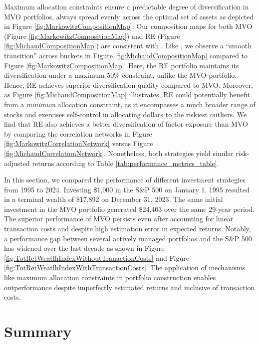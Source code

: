 \documentclass[12pt,letterpaper]{article}
\begin{document}
Maximum allocation constraints ensure a predictable degree of diversification in MVO portfolios, always spread evenly across the optimal set of assets as depicted in Figure \ref{fig:MarkowitzCompositionMap}. Our composition maps for both MVO (Figure \ref{fig:MarkowitzCompositionMap}) and RE (Figure \ref{fig:MichaudCompositionMap}) are consistent with . Like , we observe a “smooth transition” across buckets in Figure \ref{fig:MichaudCompositionMap} compared to Figure \ref{fig:MarkowitzCompositionMap}. Here, the RE portfolio maintains its diversification under a maximum 50\% constraint, unlike the MVO portfolio. Hence, RE achieves superior diversification quality compared to MVO. Moreover, as Figure \ref{fig:MichaudCompositionMap} illustrates, RE could potentially benefit from a \textit{minimum} allocation constraint, as it encompasses a much broader range of stocks and exercises self-control in allocating dollars to the riskiest outliers. We find that RE also achieves a better diversification of factor exposure than MVO by comparing the correlation networks in Figure \ref{fig:MarkowitzCorrelationNetwork} versus Figure \ref{fig:MichaudCorrelationNetwork}. Nonetheless, both strategies yield similar risk-adjusted returns according to Table \ref{tab:performance_metrics_table}.

In this section, we compared the performance of different investment strategies from 1995 to 2024. Investing \$1,000 in the S\&P 500 on January 1, 1995 resulted in a terminal wealth of \$17,892 on December 31, 2023. The same initial investment in the MVO portfolio generated \$24,403 over the same 29-year period. The superior performance of MVO persists even after accounting for linear transaction costs and despite high estimation error in expected returns. Notably, a performance gap between several actively managed portfolios and the S\&P 500 has widened over the last decade as shown in Figure \ref{fig:TotRetWeatlhIndexWithoutTranactionCosts} and Figure \ref{fig:TotRetWeatlhIndexWithTransactionCosts}. The application of mechanisms like maximum allocation constraints in portfolio construction enables outperformance despite imperfectly estimated returns and inclusive of transaction costs.

\section{Summary}
\end{document}
